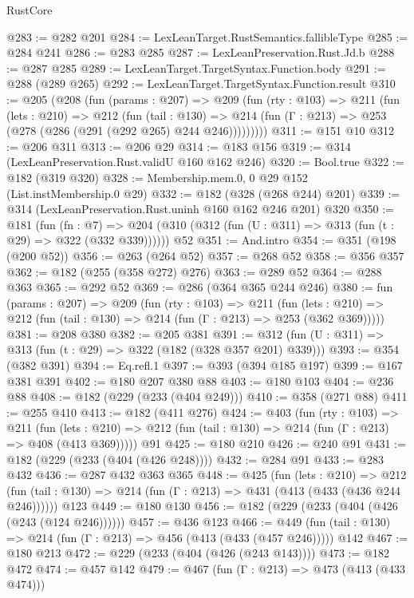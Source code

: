 \begin{lexlean}{RustCore}
\begin{coremodule}
@283 := @282 @201
@284 := LexLeanTarget.RustSemantics.fallibleType
@285 := @284 @241
@286 := @283 @285
@287 := LexLeanPreservation.Rust.Jd.b
@288 := @287 @285
@289 := LexLeanTarget.TargetSyntax.Function.body
@291 := @288 (@289 @265)
@292 := LexLeanTarget.TargetSyntax.Function.result
@310 := @205
    (@208
      (fun (params : @207) =>
      @209
        (fun (rty : @103) =>
        @211
          (fun (lets : @210) =>
          @212
            (fun (tail : @130) =>
            @214 (fun (Γ : @213) => @253 (@278 (@286 (@291 (@292 @265) @244 @246)))))))))
@311 := @151 @10
@312 := @206 @311
@313 := @206 @29
@314 := @183 @156
@319 := @314 (LexLeanPreservation.Rust.validU @160 @162 @246)
@320 := Bool.true
@322 := @182 (@319 @320)
@328 := Membership.mem.{0, 0} @29 @152 (List.instMembership.{0} @29)
@332 := @182 (@328 (@268 @244) @201)
@339 := @314 (LexLeanPreservation.Rust.uninh @160 @162 @246 @201) @320
@350 := @181
    (fun (fn : @7) =>
    @204 (@310 (@312 (fun (U : @311) => @313 (fun (t : @29) => @322 (@332 @339))))))
    @52
@351 := And.intro
@354 := @351 (@198 (@200 @52))
@356 := @263 (@264 @52)
@357 := @268 @52
@358 := @356 @357
@362 := @182 (@255 (@358 @272) @276)
@363 := @289 @52
@364 := @288 @363
@365 := @292 @52
@369 := @286 (@364 @365 @244 @246)
@380 := fun (params : @207) =>
  @209
    (fun (rty : @103) =>
    @211
      (fun (lets : @210) => @212 (fun (tail : @130) => @214 (fun (Γ : @213) => @253 (@362 @369)))))
@381 := @208 @380
@382 := @205 @381
@391 := @312 (fun (U : @311) => @313 (fun (t : @29) => @322 (@182 (@328 @357 @201) @339)))
@393 := @354 (@382 @391)
@394 := Eq.refl.{1}
@397 := @393 (@394 @185 @197)
@399 := @167 @381 @391
@402 := @180 @207 @380 @88
@403 := @180 @103
@404 := @236 @88
@408 := @182 (@229 (@233 (@404 @249)))
@410 := @358 (@271 @88)
@411 := @255 @410
@413 := @182 (@411 @276)
@424 := @403
    (fun (rty : @103) =>
    @211
      (fun (lets : @210) => @212 (fun (tail : @130) => @214 (fun (Γ : @213) => @408 (@413 @369)))))
    @91
@425 := @180 @210
@426 := @240 @91
@431 := @182 (@229 (@233 (@404 (@426 @248))))
@432 := @284 @91
@433 := @283 @432
@436 := @287 @432 @363 @365
@448 := @425
    (fun (lets : @210) =>
    @212 (fun (tail : @130) => @214 (fun (Γ : @213) => @431 (@413 (@433 (@436 @244 @246))))))
    @123
@449 := @180 @130
@456 := @182 (@229 (@233 (@404 (@426 (@243 (@124 @246))))))
@457 := @436 @123
@466 := @449 (fun (tail : @130) => @214 (fun (Γ : @213) => @456 (@413 (@433 (@457 @246))))) @142
@467 := @180 @213
@472 := @229 (@233 (@404 (@426 (@243 @143))))
@473 := @182 @472
@474 := @457 @142
@479 := @467 (fun (Γ : @213) => @473 (@413 (@433 @474)))

\end{coremodule}
\end{lexlean}

